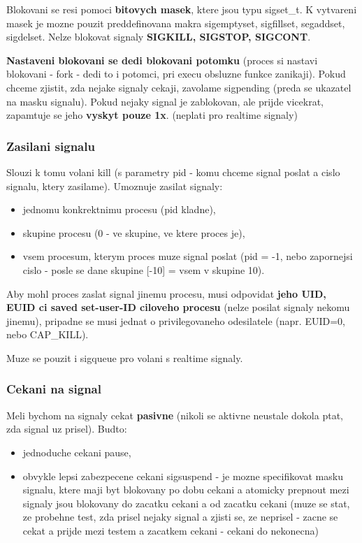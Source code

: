 \documentclass[a4paper, 11pt]{article}
\begin{document}
Blokovani se resi pomoci \textbf{bitovych masek}, ktere jsou typu sigset\_t. K vytvareni masek je mozne pouzit preddefinovana makra sigemptyset, sigfillset, segaddset, sigdelset. Nelze blokovat signaly \textbf{SIGKILL, SIGSTOP, SIGCONT}.

\textbf{Nastaveni blokovani se dedi blokovani potomku} (proces si nastavi blokovani - fork - dedi to i potomci, pri execu obsluzne funkce zanikaji). Pokud chceme zjistit, zda nejake signaly cekaji, zavolame sigpending (preda se ukazatel na masku signalu). Pokud nejaky signal je zablokovan, ale prijde vicekrat, zapamtuje se jeho \textbf{vyskyt pouze 1x}. (neplati pro realtime signaly)

\subsubsection{Zasilani signalu}
Slouzi k tomu volani kill (s parametry pid - komu chceme signal poslat a cislo signalu, ktery zasilame). Umoznuje zasilat signaly:
\begin{itemize}
    \item jednomu konkrektnimu procesu (pid kladne),
    \item skupine procesu (0 - ve skupine, ve ktere proces je),
    \item vsem procesum, kterym proces muze signal poslat (pid = -1, nebo zapornejsi cislo - posle se dane skupine [-10] = vsem v skupine 10). \\
\end{itemize}

Aby mohl proces zaslat signal jinemu procesu, musi odpovidat \textbf{jeho UID, EUID ci saved set-user-ID ciloveho procesu} (nelze posilat signaly nekomu jinemu), pripadne se musi jednat o privilegovaneho odesilatele (napr. EUID=0, nebo CAP\_KILL).

Muze se pouzit i sigqueue pro volani s realtime signaly.

\subsubsection{Cekani na signal}
Meli bychom na signaly cekat \textbf{pasivne} (nikoli se aktivne neustale dokola ptat, zda signal uz prisel). Budto:
\begin{itemize}
    \item jednoduche cekani pause,
    \item obvykle lepsi zabezpecene cekani sigsuspend - je mozne specifikovat masku signalu, ktere maji byt blokovany po dobu cekani a atomicky prepnout mezi signaly jsou blokovany do zacatku cekani a od zacatku cekani (muze se stat, ze probehne test, zda prisel nejaky signal a zjisti se, ze neprisel - zacne se cekat a prijde mezi testem a zacatkem cekani - cekani do nekonecna) \\
\end{itemize}
\end{document}
